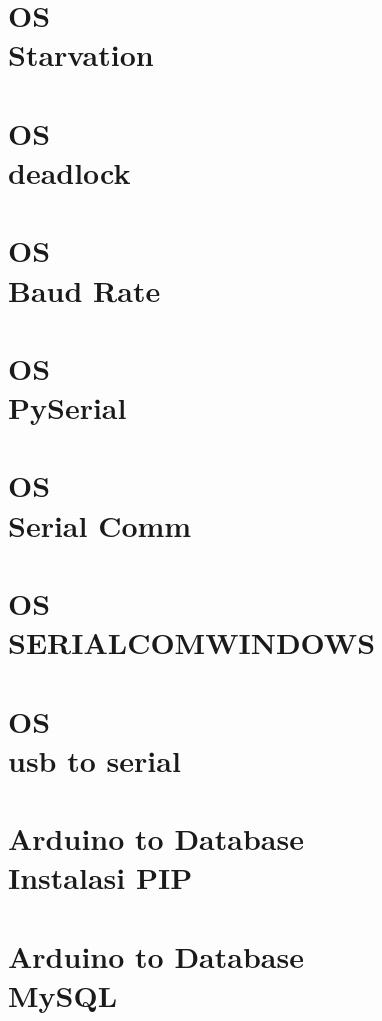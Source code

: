 \documentclass{wileySix}
\begin{document}
\chapter[Starvation]
{OS\\ Starvation}


\chapter[DeadLock]
{OS\\ deadlock}



\chapter[Baudrate]
{OS\\ Baud Rate}


\chapter[PySerial]
{OS\\ PySerial}


\chapter[Serial Communication di Linux]
{OS\\ Serial Comm}


\chapter[SERIALCOMWINDOWS]
{OS\\ SERIALCOMWINDOWS}


\chapter[usb to serial]
{OS\\ usb to serial}


\chapter[Instalasi PIP]
{Arduino to Database\\ Instalasi PIP}


\chapter[MySQL]
{Arduino to Database\\ MySQL}

\end{document}
